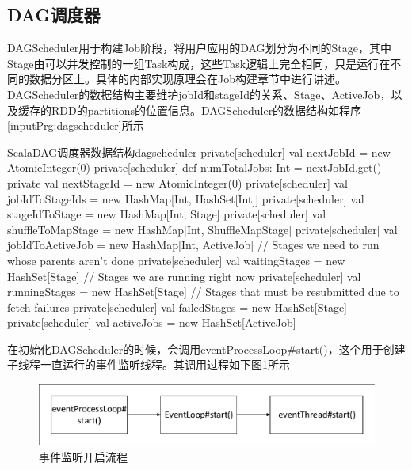 \subsection{DAG调度器}
DAGScheduler用于构建Job阶段，将用户应用的DAG划分为不同的Stage，其中Stage由可以并发控制的一组Task构成，这些Task逻辑上完全相同，只是运行在不同的数据分区上。具体的内部实现原理会在Job构建章节中进行讲述。DAGScheduler的数据结构主要维护jobId和stageId的关系、Stage、ActiveJob，以及缓存的RDD的partitions的位置信息。DAGScheduler的数据结构如程序\ref{inputPrg:dagscheduler}所示
\begin{codeInput}{Scala}{DAG调度器数据结构}{dagscheduler}
  private[scheduler] val nextJobId = new AtomicInteger(0)
  private[scheduler] def numTotalJobs: Int = nextJobId.get()
  private val nextStageId = new AtomicInteger(0)
  private[scheduler] val jobIdToStageIds = new HashMap[Int, HashSet[Int]]
  private[scheduler] val stageIdToStage = new HashMap[Int, Stage]
  private[scheduler] val shuffleToMapStage = new HashMap[Int, ShuffleMapStage]
  private[scheduler] val jobIdToActiveJob = new HashMap[Int, ActiveJob]
  // Stages we need to run whose parents aren't done
  private[scheduler] val waitingStages = new HashSet[Stage]
  // Stages we are running right now
  private[scheduler] val runningStages = new HashSet[Stage]
  // Stages that must be resubmitted due to fetch failures
  private[scheduler] val failedStages = new HashSet[Stage]
  private[scheduler] val activeJobs = new HashSet[ActiveJob]
\end{codeInput}


在初始化DAGScheduler的时候，会调用eventProcessLoop\#start()，这个用于创建子线程一直运行的事件监听线程。其调用过程如下图\ref{fig:eventListener}所示
\begin{figure}[H] 
	\centering
	\includegraphics[width=\textwidth]{figures/eventListener.pdf}
	\caption{事件监听开启流程}
	\label{fig:eventListener}
\end{figure}

